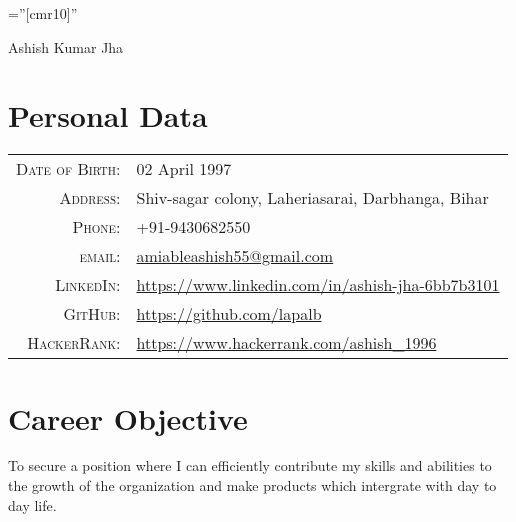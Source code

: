 \documentclass[a4paper,10pt]{article}
\begin{document}

\pagestyle{empty} %

\font\fb=''[cmr10]'' %



\par{\centering
		{\Huge Ashish Kumar Jha
	}\bigskip\par}

\section{Personal Data}

\begin{tabular}{rl}
    \textsc{Date of Birth:} & 02 April 1997 \\
    \textsc{Address:}   & Shiv-sagar colony, Laheriasarai, Darbhanga, Bihar \\
    \textsc{Phone:}     & +91-9430682550\\
    \textsc{email:}     & \href{mailto:e-mail id}{amiableashish55@gmail.com}\\
    \textsc{LinkedIn:}&\url{https://www.linkedin.com/in/ashish-jha-6bb7b3101}\\
    \textsc{GitHub:}&\url{https://github.com/lapalb}\\
    \textsc{HackerRank:}&\url{https://www.hackerrank.com/ashish\_1996}
    
    
\end{tabular}

\section{Career Objective}

\footnotesize{To secure a position where I can efficiently contribute my skills and abilities to the growth of the organization and make products which intergrate with day to day life.}
\end{document}
